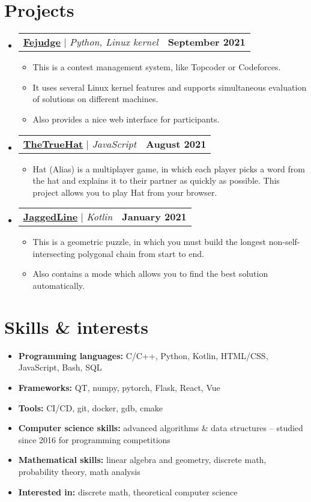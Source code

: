 \documentclass[letterpaper,11pt]{article}
\makeatletter
\newcommand{\resumeProjectHeading}[2]{
    \item
    \begin{tabular*}{1.0\textwidth}{l@{\extracolsep{\fill}}r}
        \small #1 & \textbf{\small #2} \\
    \end{tabular*}\vspace{-5pt}
}
\newcommand{\resumeSubHeadingListStart}{\begin{itemize}[leftmargin=0.0in, label={}]}
\newcommand{\resumeSubHeadingListEnd}{\end{itemize}}
\newcommand{\resumeItemListStart}{\begin{itemize}}
\newcommand{\resumeItemListEnd}{\end{itemize}\vspace{-8pt}}
\newcommand{\resumeItem}[1]{\item\small{{#1 \vspace{-2pt}}}}
\newcommand{\resumeSubItem}[1]{\resumeItem{#1}\vspace{-4pt}}
\makeatother
\begin{document}
\section{Projects}
    \resumeSubHeadingListStart

        \resumeProjectHeading
        {\textbf{\href{https://github.com/m20-sch57/Fejudge}{\underline{Fejudge}}} $|$ \emph{Python, Linux kernel}}{September 2021}
        \resumeItemListStart
            \resumeItem{This is a contest management system, like Topcoder or Codeforces.}
            \resumeItem{It uses several Linux kernel features and supports simultaneous evaluation of solutions on different machines.}
            \resumeItem{Also provides a nice web interface for participants.}
        \resumeItemListEnd

        \resumeProjectHeading
        {\textbf{\href{https://github.com/m20-sch57/thetruehat}{\underline{TheTrueHat}}} $|$ \emph{JavaScript}}{August 2021}
        \resumeItemListStart
            \resumeItem{Hat (Alias) is a multiplayer game, in which each player picks a word from the hat and explains it to their partner as quickly as possible. This project allows you to play Hat from your browser.}
        \resumeItemListEnd 

        \resumeProjectHeading
        {\textbf{\href{https://github.com/JaggedLine/KotlinLine}{\underline{JaggedLine}}} $|$ \emph{Kotlin}}{January 2021}
        \resumeItemListStart
            \resumeItem{This is a geometric puzzle, in which you must build the longest non-self-intersecting polygonal chain from start to end.}
            \resumeItem{Also contains a mode which allows you to find the best solution automatically.}
        \resumeItemListEnd

    \resumeSubHeadingListEnd


\section{Skills \& interests}
    \resumeItemListStart
        \resumeSubItem{\textbf{Programming languages: }{C/C++, Python, Kotlin, HTML/CSS, JavaScript, Bash, SQL}}
        \resumeSubItem{\textbf{Frameworks: }{QT, numpy, pytorch, Flask, React, Vue}}
        \resumeSubItem{\textbf{Tools: }{CI/CD, git, docker, gdb, cmake}}
        \resumeSubItem{\textbf{Computer science skills: }{advanced algorithms \& data structures -- studied since 2016 for programming competitions}}
        \resumeSubItem{\textbf{Mathematical skills: }{linear algebra and geometry, discrete math, probability theory, math analysis}}
        \resumeSubItem{\textbf{Interested in: }{discrete math, theoretical computer science}}
    \resumeItemListEnd
\end{document}
